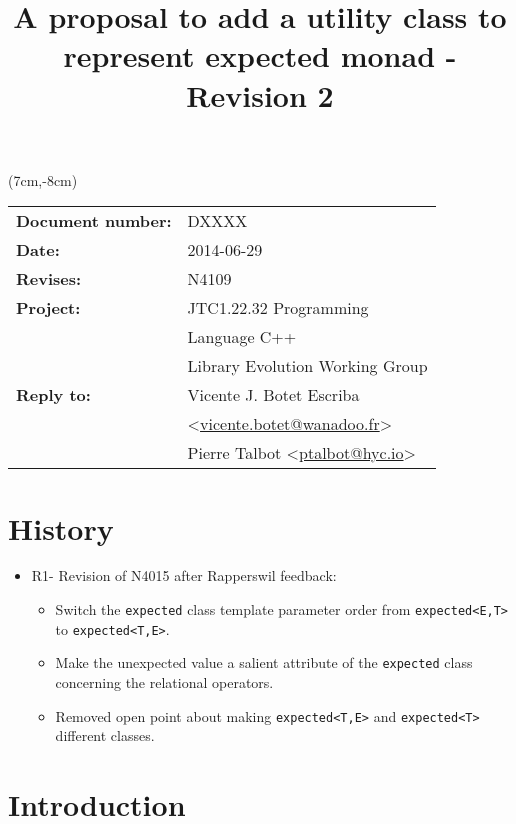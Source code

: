 \documentclass[a4paper,10pt]{article}
\title{A proposal to add a utility class to represent expected monad - Revision 2}
\author{}
\date{}
\newcommand{\cpp}[1]{\lstinline{#1}}
\begin{document}
\maketitle
\begin{textblock*}{9cm}(7cm,-8cm)
\begin{tabular}{l l}
\textbf{Document number:} & DXXXX \\
\textbf{Date:}  & 2014-06-29 \\
\textbf{Revises:} & N4109 \\
\textbf{Project:} & JTC1.22.32 Programming \\
 & Language C++ \\
 & Library Evolution Working Group \\
\textbf{Reply to:} & Vicente J. Botet Escriba \\
 & <\href{mailto:vicente.botet@wanadoo.fr}{vicente.botet@wanadoo.fr}> \\
 & Pierre Talbot <\href{mailto:ptalbot@hyc.io}{ptalbot@hyc.io}>
\end{tabular}
\end{textblock*}

\vspace{-6em}
\setcounter{tocdepth}{1}
\tableofcontents

\section{History}
\label{history}

\begin{itemize}
\item R1- Revision of N4015 \cite{ExpectedR0} after Rapperswil feedback: 
\begin{itemize}
\item Switch the \cpp{expected} class template parameter order from \cpp{expected<E,T>} to \cpp{expected<T,E>}.
\item Make the unexpected value a salient attribute of the \cpp{expected} class concerning the relational operators.
\item Removed open point about making \cpp{expected<T,E>} and \cpp{expected<T>} different classes.
\end{itemize}
\end{itemize}

\section{Introduction}
\end{document}
